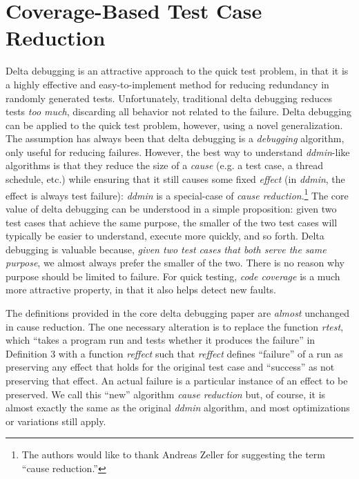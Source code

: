 \section{Coverage-Based Test Case Reduction}

Delta debugging is an attractive approach to the quick test problem,
in that it is a highly effective and easy-to-implement method for
reducing redundancy in randomly generated tests.  Unfortunately,
traditional delta debugging reduces tests \emph{too much}, discarding
all behavior not related to the failure.  Delta debugging can be
applied to the quick test problem, however, using a novel
generalization.  The assumption has always been that delta debugging
is a \emph{debugging} algorithm, only useful for reducing failures.
However, the best way to understand \emph{ddmin}-like algorithms is
that they reduce the size of a \emph{cause} (e.g. a test case, a
thread schedule, etc.) while ensuring that it still causes some fixed
\emph{effect} (in \emph{ddmin}, the effect is always test failure):
\emph{ddmin} is a special-case of \emph{cause reduction}.\footnote{The
authors would like to thank Andreas Zeller for suggesting the term
``cause reduction.''}  The core value of delta debugging can be
understood in a simple proposition: given two test cases that achieve
the same purpose, the smaller of the two test cases will typically be
easier to understand, execute more quickly, and so forth.  Delta
debugging is valuable because, \emph{given two test cases that both
serve the same purpose}, we almost always prefer the smaller of the
two.  There is no reason why purpose should be limited to failure.
For quick testing, \emph{code coverage} is a much more attractive
property, in that it also helps detect new faults.



The definitions provided in the core delta debugging paper \cite{DD}
are \emph{almost} unchanged in cause reduction.  The one necessary
alteration is to replace the function \emph{rtest}, which ``takes a
program run and tests whether it produces the failure'' in Definition
3 \cite{DD} with a function \emph{reffect} such that \emph{reffect}
defines ``failure'' of a run as preserving any effect that
holds for the original test case and ``success'' as not preserving
that effect.  An actual failure is a particular instance of an effect
to be preserved.  We call this ``new'' algorithm \emph{cause
reduction} but, of course, it is almost exactly the same as the
original \emph{ddmin} algorithm, and most optimizations or variations
still apply.

